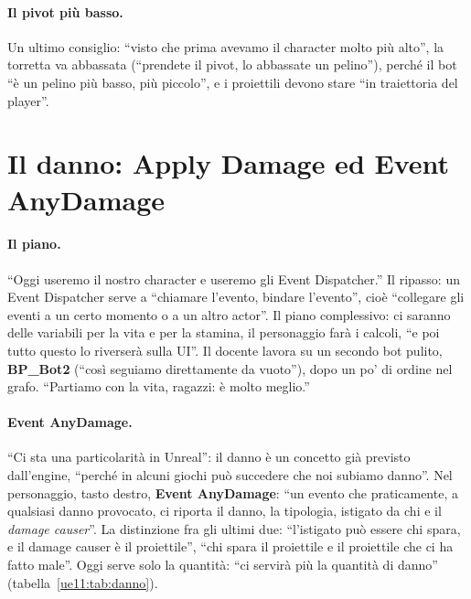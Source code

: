 \paragraph{Il pivot più basso.} Un ultimo consiglio: ``visto che prima avevamo il
character molto più alto'', la torretta va abbassata (``prendete il pivot, lo abbassate
un pelino''), perché il bot ``è un pelino più basso, più piccolo'', e i proiettili devono
stare ``in traiettoria del player''.

\section{Il danno: Apply Damage ed Event AnyDamage}
\label{ue11:sec:danno}

\paragraph{Il piano.} ``Oggi useremo il nostro character e useremo gli Event
Dispatcher.'' Il ripasso: un Event Dispatcher serve a ``chiamare l'evento, bindare
l'evento'', cioè ``collegare gli eventi a un certo momento o a un altro actor''. Il piano
complessivo: ci saranno delle variabili per la vita e per la stamina, il personaggio farà i
calcoli, ``e poi tutto questo lo riverserà sulla UI''. Il docente lavora su un secondo
bot pulito, \textbf{BP\_Bot2} (``così seguiamo direttamente da vuoto''), dopo un po' di
ordine nel grafo. ``Partiamo con la vita, ragazzi: è molto meglio.''

\paragraph{Event AnyDamage.} ``Ci sta una particolarità in Unreal'': il danno è un
concetto già previsto dall'engine, ``perché in alcuni giochi può succedere che noi
subiamo danno''. Nel personaggio, tasto destro, \textbf{Event AnyDamage}: ``un evento che
praticamente, a qualsiasi danno provocato, ci riporta il danno, la tipologia, istigato da
chi e il \emph{damage causer}''. La distinzione fra gli ultimi due: ``l'istigato può essere
chi spara, e il damage causer è il proiettile'', ``chi spara il proiettile e il proiettile
che ci ha fatto male''. Oggi serve solo la quantità: ``ci servirà più la quantità di
danno'' (tabella~\ref{ue11:tab:danno}).

